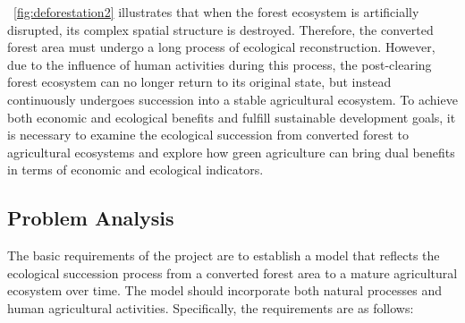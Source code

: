 \documentclass{HZNUMCM}
\begin{document}
    \figurename~\ref{fig:deforestation2} illustrates that when the forest ecosystem is artificially disrupted, 
    its complex spatial structure is destroyed.
    Therefore, the converted forest area must undergo a long process of ecological reconstruction. 
    However, due to the influence of human activities during this process, 
    the post-clearing forest ecosystem can no longer return to its original state, 
    but instead continuously undergoes succession into a stable agricultural ecosystem. 
    To achieve both economic and ecological benefits and fulfill sustainable development goals, 
    it is necessary to examine the ecological succession from converted forest to agricultural ecosystems and explore how green agriculture can bring dual benefits in terms of economic and ecological indicators.
    \subsection{Problem Analysis}
      The basic requirements of the project are to establish a model that reflects the ecological succession process from a converted forest area to a mature agricultural ecosystem over time. 
      The model should incorporate both natural processes and human agricultural activities. 
      Specifically, the requirements are as follows:
\end{document}

